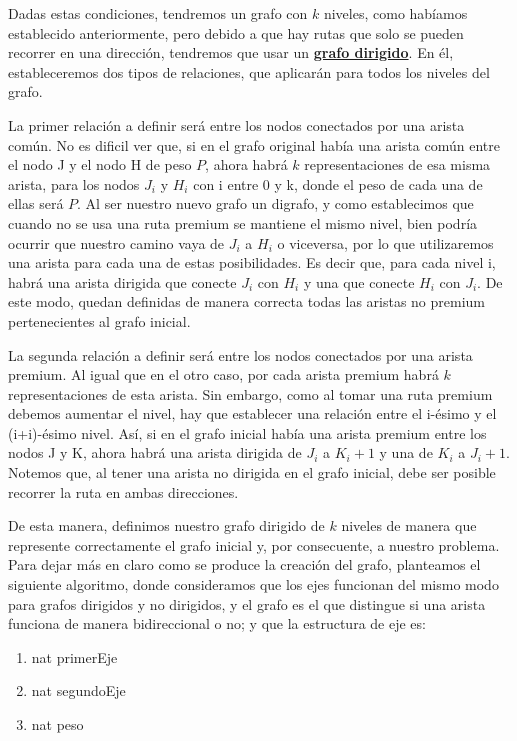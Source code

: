 Dadas estas condiciones, tendremos un grafo con $k$ niveles, como habíamos establecido anteriormente, pero debido a que hay rutas que solo se pueden recorrer en una dirección, tendremos que usar un \underline{\textbf{grafo dirigido}}. En él, estableceremos dos tipos de relaciones, que aplicarán para todos los niveles del grafo.
\\
\par
La primer relación a definir será entre los nodos conectados por una arista común. No es dificil ver que, si en el grafo original había una arista común entre el nodo J y el nodo H de peso $P$, ahora habrá $k$ representaciones de esa misma arista, para los nodos $J_i$ y $H_i$ con i entre 0 y k, donde el peso de cada una de ellas será $P$. Al ser nuestro nuevo grafo un digrafo, y como establecimos que cuando no se usa una ruta premium se mantiene el mismo nivel, bien podría ocurrir que nuestro camino vaya de $J_i$ a $H_i$ o viceversa, por lo que utilizaremos una arista para cada una de estas posibilidades. Es decir que, para cada nivel i, habrá una arista dirigida que conecte $J_i$ con $H_i$ y una que conecte $H_i$ con $J_i$. De este modo, quedan definidas de manera correcta todas las aristas no premium pertenecientes al grafo inicial.
\\
\par
La segunda relación a definir será entre los nodos conectados por una arista premium. Al igual que en el otro caso, por cada arista premium habrá $k$ representaciones de esta arista. Sin embargo, como al tomar una ruta premium debemos aumentar el nivel, hay que establecer una relación entre el i-ésimo y el (i+i)-ésimo nivel. Así, si en el grafo inicial había una arista premium entre los nodos J y K, ahora habrá una arista dirigida de $J_i$ a $K_i+1$ y una de $K_i$ a $J_i+1$. Notemos que, al tener una arista no dirigida en el grafo inicial, debe ser posible recorrer la ruta en ambas direcciones.
\\
\par
De esta manera, definimos nuestro grafo dirigido de $k$ niveles de manera que represente correctamente el grafo inicial y, por consecuente, a nuestro problema. Para dejar más en claro como se produce la creación del grafo, planteamos el siguiente algoritmo, donde consideramos que los ejes funcionan del mismo modo para grafos dirigidos y no dirigidos, y el grafo es el que distingue si una arista funciona de manera bidireccional o no; y que la estructura de eje es:
\begin{enumerate}
\item nat primerEje
\item nat segundoEje
\item nat peso
\end{enumerate}
